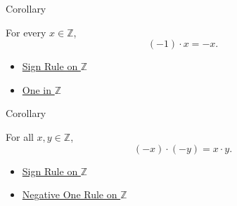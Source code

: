 \begin{corollarybox}{Corollary}
\begin{corollary}
\label{cor:negative-one-rule-on-z}
For every $x\in\mathbb{Z}$,
\[
(-1)\cdot x=-x.
\]
\end{corollary}
\end{corollarybox}

\begin{dependencies}
\begin{itemize}
  \item \hyperref[cor:sign-rule-on-z]{Sign Rule on $\mathbb{Z}$}
  \item \hyperref[def:one-in-z]{One in $\mathbb{Z}$}
\end{itemize}
\end{dependencies}

\begin{corollarybox}{Corollary}
\begin{corollary}
\label{cor:product-of-negatives-on-z}
For all $x,y\in\mathbb{Z}$,
\[
(-x)\cdot(-y)=x\cdot y.
\]
\end{corollary}
\end{corollarybox}

\begin{dependencies}
\begin{itemize}
  \item \hyperref[cor:sign-rule-on-z]{Sign Rule on $\mathbb{Z}$}
  \item \hyperref[cor:negative-one-rule-on-z]{Negative One Rule on $\mathbb{Z}$}
\end{itemize}
\end{dependencies}

